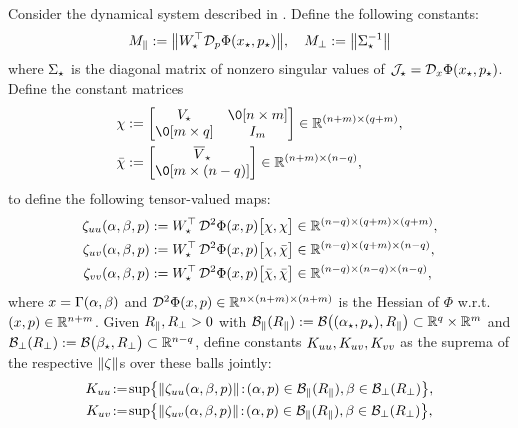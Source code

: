 \documentclass[a4paper]{cas-dc}
\begin{document}
\begin{theorem}
    \label{thm:lsr2}
    Consider the dynamical system described in .
    Define the following constants:
    \begin{equation}
        M_{\parallel} := \norm{W_{\star }^{\top} \mathcal{D}_{p}\Phi(x_{\star},p_{\star})}, \quad M_{\perp} := \norm{\Sigma_{\star }^{-1}}
        \label{def:lsr2-M}
    \end{equation}
    where \(\Sigma_{\star }\) is the diagonal matrix of nonzero singular values of \(\mathcal{J}_{\star }=\mathcal{D}_{x}\Phi(x_{\star},p_{\star})\). Define the constant matrices
    \begin{align*}
        \chi       & := \begin{bmatrix}\V & \0[n \times m] \\ \0[m \times q] & I_{m}\end{bmatrix} \in \R[(n+m)\times(q+m)], \\
        \bar{\chi} & := \begin{bmatrix} \Vbar \\ \0[m\times(n-q)]\end{bmatrix} \in \R[(n+m)\times(n-q)],
    \end{align*}
    to define the following tensor-valued maps:
    \begin{align}
        \zuu[p] & := \W^{\top} \, \D^2 \Phi(x,p) \bigl[\chi, \chi\bigr]             \in \R[(n-q)\times(q+m)\times(q+m)], \notag                \\
        \zuv[p] & := \W^{\top} \, \D^2 \Phi(x,p) \bigl[\chi, \bar{\chi}\bigr]       \in \R[(n-q)\times(q+m)\times(n-q)], \notag                \\
        \zvv[p] & := \W^{\top} \, \D^2 \Phi(x,p) \bigl[\bar{\chi}, \bar{\chi}\bigr] \in \R[(n-q)\times(n-q)\times(n-q)], \label{def:lsr2-zeta}
    \end{align}
    where \(x=\Gamma(\alpha,\beta)\) and \(\D^2 \Phi(x,p) \in \R[n\times(n+m)\times(n+m)]\) is the Hessian of \(\Phi\) w.r.t. \((x,p) \in \R[n+m]\).
    Given \(R_{\parallel},R_{\perp} > 0\) with \(\Bpr[\Rpr] := \Bpara[\Rpr] \subset \R[q] \times \R[m]\) and \(\Bpp[\Rpp] := \Bperp[\Rpp] \subset \R[n-q]\), define constants \(K_{uu}, K_{uv}, K_{vv}\) as the suprema of the respective \(\norm{\zeta}\)s over these balls jointly:
    \begin{align}
        \Kuu & \!:=\! \sup\bigl\{\norm{\zuu[p]} \!:\! (\A,p) \in \Bpr[\Rpr], \B \in \Bpp[\Rpp]\bigr\}, \notag \\
        \Kuv & \!:=\! \sup\bigl\{\norm{\zuv[p]} \!:\! (\A,p) \in \Bpr[\Rpr], \B \in \Bpp[\Rpp]\bigr\}, \notag \\

\end{align}
\end{theorem}
\end{document}
